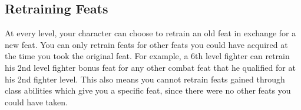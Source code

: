     \subsection{Retraining Feats}
        At every level, your character can choose to retrain an old feat in exchange for a new feat.
        You can only retrain feats for other feats you could have acquired at the time you took the original feat.
        For example, a 6th level fighter can retrain his 2nd level fighter bonus feat for any other combat feat that he qualified for at his 2nd fighter level.
        This also means you cannot retrain feats gained through class abilities which give you a specific feat, since there were no other feats you could have taken.
